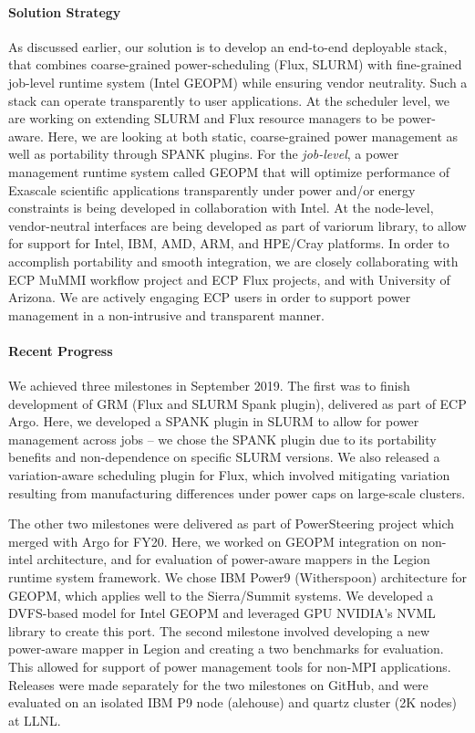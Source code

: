 \paragraph{Solution Strategy}
As discussed earlier, our solution is to develop an end-to-end deployable stack, that combines coarse-grained power-scheduling (Flux, SLURM) with fine-grained job-level runtime system (Intel GEOPM) while ensuring vendor neutrality. Such a stack can operate transparently to user applications.  At the scheduler level, we are working on extending SLURM and Flux resource managers to be power-aware. Here, we are looking at both static, coarse-grained power management as well as portability through SPANK plugins. For the \emph{job-level}, a power management runtime system called GEOPM that will optimize performance of Exascale scientific applications transparently under power and/or energy constraints is being developed in collaboration with Intel. At the node-level, vendor-neutral interfaces are being developed as part of variorum library, to allow for support for Intel, IBM, AMD, ARM, and HPE/Cray platforms.  In order to accomplish portability and smooth integration, we are closely collaborating with ECP MuMMI workflow project and ECP Flux projects, and with University of Arizona. We are actively engaging ECP users in order to support power management in a non-intrusive and transparent manner. 

\paragraph{Recent Progress}
We achieved three milestones in September 2019. The first was to finish development of GRM (Flux and SLURM Spank plugin), delivered as part of ECP Argo. Here, we developed a SPANK plugin in SLURM to allow for power management across jobs -- we chose the SPANK plugin due to its portability benefits and non-dependence on specific SLURM versions. We also released a variation-aware scheduling plugin for Flux, which involved mitigating variation resulting from manufacturing differences under power caps on large-scale clusters. 

The other two milestones were delivered as part of PowerSteering project which merged with Argo for FY20. Here, we worked on GEOPM integration on non-intel architecture, and for evaluation of power-aware mappers in the Legion runtime system framework. We chose IBM Power9 (Witherspoon) architecture for GEOPM, which applies well to the Sierra/Summit systems. We developed a DVFS-based model for Intel GEOPM and leveraged GPU NVIDIA's NVML library to create this port.  The second milestone involved developing a new power-aware mapper in Legion and creating a two benchmarks for evaluation. This allowed for support of power management tools for non-MPI applications. Releases were made separately for the two milestones on GitHub, and were evaluated on an isolated IBM P9 node (alehouse) and quartz cluster (2K nodes) at LLNL. 

